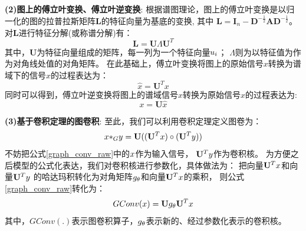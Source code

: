   \textbf{(2)图上的傅立叶变换、傅立叶逆变换}:
  根据谱图理论，图上的傅立叶变换是以归一化的图的拉普拉斯矩阵$\mathbf{L}$的特征向量为基底的变换,
  其中 $\mathbf{L}= \mathbf{I}_n - 
  \mathbf{D}^{-\frac{1}{2}}\mathbf{A}\mathbf{D}^{-\frac{1}{2}}$。
  对$\mathbf{L}$进行特征分解(或称谱分解)有：
  \begin{equation} \label{eigen_decomp_L}
    \mathbf{L} = \mathbf{U}\Lambda\mathbf{U}^{T}
  \end{equation}
  其中，$\mathbf{U}$为特征向量组成的矩阵，每一列为一个特征向量$\mathnormal{u_i}$；
  $\Lambda$则为以特征值为作为对角线处值的对角矩阵。
  在此基础上，傅立叶变换将图上的原始信号$x$转换为谱域下的信号$\hat{x}$的过程表达为：
  \begin{equation} \label{fourier_trans}
    \hat{x} = {\mathbf{U}}^{T}x
  \end{equation}
  同时可以得到，傅立叶逆变换将图上的谱域信号$\hat{x}$转换为原始信号$x$的过程表达为:
  \begin{equation} \label{reverse_fourier_trans}
    x = \mathbf{U}\hat{x} 
  \end{equation}

  \textbf{(3)基于卷积定理的图卷积}:
  至此，我们可以利用卷积定理定义图卷为：
  \begin{equation} \label{graph_conv_raw}
    \mathnormal{x}{\ast}_{\mathnormal{G}}\mathnormal{y} = 
    \mathbf{U}((\mathbf{U}^T\mathnormal{x}) \circ (\mathbf{U}^T\mathnormal{y}))
  \end{equation}
  不妨把公式\ref*{graph_conv_raw}中的$\mathnormal{x}$作为输入信号，
  $\mathbf{U}^T\mathnormal{y}$作为卷积核。
  为方便之后模型的公式化表达，我们对卷积核进行参数化，具体做法为：
  把向量$\mathbf{U}^T\mathnormal{x}$和向量$\mathbf{U}^T\mathnormal{y}$
  的哈达玛积转化为对角矩阵$\mathnormal{g}_\theta$和向量$\mathbf{U}^T\mathnormal{x}$的乘积，
  则公式\ref*{graph_conv_raw}转化为：
  \begin{equation} \label{graph_conv_gtheta}
    GConv(\mathnormal{x}) = 
    \mathbf{U}\mathnormal{g}_\theta\mathbf{U}^T\mathnormal{x} 
  \end{equation}
  其中，$GConv(.)$表示图卷积算子，$\mathnormal{g}_\theta$表示新的、经过参数化表示的卷积核。

